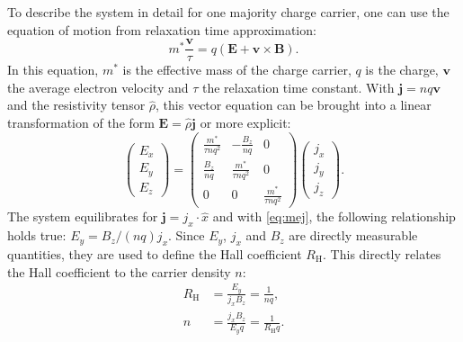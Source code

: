 To describe the system in detail for one majority charge carrier, one can use the 
equation of motion from relaxation time approximation:
\begin{equation}
	m^{*} \frac{\mathbf{v}}{\tau}=q(\mathbf{E}
	+\mathbf{v}\times \mathbf{B}).
\end{equation}
In this equation, $m^{*}$ is the effective mass of the charge carrier, $q$ is the charge, 
$\mathbf{v}$ the average electron velocity and $\tau$ the relaxation time constant.
With $\mathbf{j}=nq\mathbf{v}$ and the resistivity tensor $\hat{\rho}$, 
this vector equation can be brought into a linear transformation of the form
$\mathbf{E}=\hat{\rho}\mathbf{j}$ or more explicit:
\begin{equation}
	\label{eq:mej}
	\begin{pmatrix}
		E_{x} \\
		E_{y} \\
		E_{z}
	\end{pmatrix}
	=
	\begin{pmatrix}
		\frac{m^{*}}{\tau nq^{2}} & - \frac{B_{z}}{nq}        & 0                         \\
		\frac{B_{z}}{nq}          & \frac{m^{*}}{\tau nq^{2}} & 0                         \\
		0                         & 0                         & \frac{m^{*}}{\tau nq^{2}}
	\end{pmatrix}
	\begin{pmatrix}
		j_{x} \\
		j_{y} \\
		j_{z}
	\end{pmatrix}.
\end{equation}
The system equilibrates for $\mathbf{j} = j_x \cdot \hat{x}$ and with \cref{eq:mej}, the following
relationship holds true: $E_{y} = B_{z} / (nq) j_{x}$.
Since $E_y$, $j_x$ and $B_z$ are directly measurable quantities,
they are used to define the Hall coefficient $R_{\mathrm{H}}$.
This directly relates the Hall coefficient to the carrier density $n$:
\begin{align}
	R_{\mathrm{H}}&=\frac{E_{y}}{j_{x}B_{z}}=\frac{1}{nq},
	\label{eq:hall_coefficient} \\
	n&=\frac{j_{x}B_{z}}{E_{y}q} = \frac{1}{R_{\mathrm{H}}q}.
	\label{eq:hall_concentration}
\end{align}

